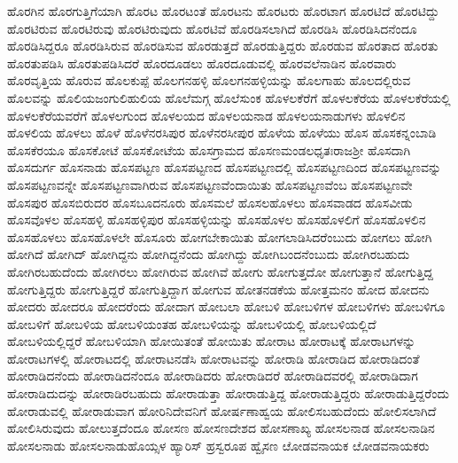 {ಹೊರಗಿನ
ಹೊರಗುತ್ತಿಗೆಯಾಗಿ
ಹೊರಟ
ಹೊರಟಂತೆ
ಹೊರಟನು
ಹೊರಟರು
ಹೊರಟಾಗ
ಹೊರಟಿದೆ
ಹೊರಟಿದ್ದು
ಹೊರಟಿರುವ
ಹೊರಟಿರುವು
ಹೊರಟಿರುವುದು
ಹೊರಟಿವೆ
ಹೊರಡಿಸಲಾಗಿದೆ
ಹೊರಡಿಸಿ
ಹೊರಡಿಸಿದನೆಂದೂ
ಹೊರಡಿಸಿದ್ದರೂ
ಹೊರಡಿಸಿರುವ
ಹೊರಡಿಸುವ
ಹೊರಡುತ್ತದೆ
ಹೊರಡುತ್ತಿದ್ದರು
ಹೊರಡುವ
ಹೊರತಾದ
ಹೊರತು
ಹೊರತುಪಡಿಸಿ
ಹೊರತುಪಡಿಸಿದರೆ
ಹೊರದೂಡಲು
ಹೊರದೂಡುವಲ್ಲಿ
ಹೊರವಲೆನಾಡಿನ
ಹೊರವಾರು
ಹೊರವೃತ್ತಿಯ
ಹೊರುವ
ಹೊಲಕುಪ್ಪೆ
ಹೊಲಗನಹಳ್ಳಿ
ಹೊಲಗನಹಳ್ಳಿಯನ್ನು
ಹೊಲಗಾಹು
ಹೊಲದಲ್ಲಿರುವ
ಹೊಲವನ್ನು
ಹೊಲಿಯಜಂಗುಲಿಹುಲಿಯ
ಹೊಲೆಮಗ್ಗ
ಹೊಲೆಸುಂಕ
ಹೊಳಲಕೆರೆಗೆ
ಹೊಳಲಕೆರೆಯ
ಹೊಳಲಕೆರೆಯಲ್ಲಿ
ಹೊಳಲಕೆರೆಯವರೆಗೆ
ಹೊಳಲಗುಂದ
ಹೊಳಲಯದ
ಹೊಳಲಯನಾಡ
ಹೊಳಲಯನಾಡುಗಳು
ಹೊಳಲಿನ
ಹೊಳಲಿಯ
ಹೊಳಲು
ಹೊಳೆ
ಹೊಳೆನರಸಿಪುರ
ಹೊಳೆನರಸೀಪುರ
ಹೊಳೆಯ
ಹೊಳೆಯು
ಹೊಸ
ಹೊಸಕನ್ನಂಬಾಡಿ
ಹೊಸಕೆರಯೂ
ಹೊಸಕೋಟೆ
ಹೊಸಕೋಟೆಯ
ಹೊಸಗ್ರಾಮದ
ಹೊಸಣಮಂಡಲಧೃತಃರಾಜಶ್ರೀ
ಹೊಸದಾಗಿ
ಹೊಸದುರ್ಗ
ಹೊಸನಾಡು
ಹೊಸಪಟ್ಟಣ
ಹೊಸಪಟ್ಟಣದ
ಹೊಸಪಟ್ಟಣದಲ್ಲಿ
ಹೊಸಪಟ್ಟಣದಿಂದ
ಹೊಸಪಟ್ಟಣವನ್ನು
ಹೊಸಪಟ್ಟಣವನ್ನೇ
ಹೊಸಪಟ್ಟಣವಾಗಿರುವ
ಹೊಸಪಟ್ಟಣವೆಂದಾಯಿತು
ಹೊಸಪಟ್ಟಣವೆಂಬ
ಹೊಸಪಟ್ಟಣವೇ
ಹೊಸಪುರ
ಹೊಸಬಿರುದರ
ಹೊಸಬೂದನೂರು
ಹೊಸಮಲೆ
ಹೊಸಲಹೊಳಲು
ಹೊಸವಾಡದ
ಹೊಸವೀಡು
ಹೊಸವೊಳಲ
ಹೊಸಹಳ್ಳಿ
ಹೊಸಹಳ್ಳಿಪುರ
ಹೊಸಹಳ್ಳಿಯನ್ನು
ಹೊಸಹೊಳಲ
ಹೊಸಹೊಳಲಿಗೆ
ಹೊಸಹೊಳಲಿನ
ಹೊಸಹೊಳಲು
ಹೊಸಹೊಳಲೇ
ಹೊಸೂರು
ಹೋಗಬೇಕಾಯಿತು
ಹೋಗಲಾಡಿಸಿದರೆಂಬುದು
ಹೋಗಲು
ಹೋಗಿ
ಹೋಗಿದೆ
ಹೋಗಿದ್
ಹೋಗಿದ್ದನು
ಹೋಗಿದ್ದನೆಂದು
ಹೋಗಿದ್ದು
ಹೋಗಿಬಂದನೆಂಬುದು
ಹೋಗಿರಬಹುದು
ಹೋಗಿರಬಹುದೆಂದು
ಹೋಗಿರಲು
ಹೋಗಿರುವ
ಹೋಗಿವೆ
ಹೋಗು
ಹೋಗುತ್ತದೋ
ಹೋಗುತ್ತಾನೆ
ಹೋಗುತ್ತಿದ್ದ
ಹೋಗುತ್ತಿದ್ದರು
ಹೋಗುತ್ತಿದ್ದರೆ
ಹೋಗುತ್ತಿದ್ದಾಗ
ಹೋಗುವ
ಹೋತನಡಕೆಯ
ಹೋತ್ತಮನಂ
ಹೋದ
ಹೋದನು
ಹೋದರು
ಹೋದರೂ
ಹೋದರೆಂದು
ಹೋದಾಗ
ಹೋಬಲಾ
ಹೋಬಳಿ
ಹೋಬಳಿಗಳ
ಹೋಬಳಿಗಳು
ಹೋಬಳಿಗೂ
ಹೋಬಳಿಗೆ
ಹೋಬಳಿಯ
ಹೋಬಳಿಯಂತಹ
ಹೋಬಳಿಯನ್ನು
ಹೋಬಳಿಯಲ್ಲಿ
ಹೋಬಳಿಯಲ್ಲಿದೆ
ಹೋಬಳಿಯಲ್ಲಿದ್ದರೆ
ಹೋಬಳಿಯಾಗಿ
ಹೋಯಿತಂತೆ
ಹೋಯಿತು
ಹೋರಾಟ
ಹೋರಾಟಕ್ಕೆ
ಹೋರಾಟಗಳನ್ನು
ಹೋರಾಟಗಳಲ್ಲಿ
ಹೋರಾಟದಲ್ಲಿ
ಹೋರಾಟನಡೆಸಿ
ಹೋರಾಟವನ್ನು
ಹೋರಾಡಿ
ಹೋರಾಡಿದ
ಹೋರಾಡಿದಂತೆ
ಹೋರಾಡಿದನೆಂದು
ಹೋರಾಡಿದನೆಂದೂ
ಹೋರಾಡಿದರು
ಹೋರಾಡಿದರೆ
ಹೋರಾಡಿದವರಲ್ಲಿ
ಹೋರಾಡಿದಾಗ
ಹೋರಾಡಿದುದನ್ನು
ಹೋರಾಡಿರಬಹುದು
ಹೋರಾಡುತ್ತಾ
ಹೋರಾಡುತ್ತಿದ್ದ
ಹೋರಾಡುತ್ತಿದ್ದರು
ಹೋರಾಡುತ್ತಿದ್ದರೆಂದು
ಹೋರಾಡುವಲ್ಲಿ
ಹೋರಾಡುವಾಗ
ಹೋರಿನಿದೇವನಿಗೆ
ಹೋರ್ಷಣಾಹ್ವಯ
ಹೋಲಿಸಬಹುದೆಂದು
ಹೋಲಿಸಲಾಗಿದೆ
ಹೋಲಿಸಿರುವುದು
ಹೋಲುತ್ತದೆಂದೂ
ಹೋಸಣ
ಹೋಸಣದೇಶದ
ಹೋಸಣಾಖ್ಯ
ಹೋಸಲನಾಡ
ಹೋಸಲನಾಡಿನ
ಹೋಸಲನಾಡು
ಹೋಸಲನಾಡುಹೊಯ್ಸಳ
ಹ್ಯಾರಿಸ್
ಹ್ರಸ್ವರೂಪ
ಹ್ವೈಸಣ
ೞೋಡವನಾಯಕ
ೞೋಡವನಾಯಕರು
}
